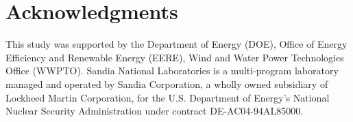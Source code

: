 \section{Acknowledgments}

This study was supported by the Department of Energy (DOE), Office of Energy
Efficiency and Renewable Energy (EERE), Wind and Water Power Technologies Office
(WWPTO). Sandia National Laboratories is a multi-program laboratory managed and
operated by Sandia Corporation, a wholly owned subsidiary of Lockheed Martin
Corporation, for the U.S. Department of Energy's National Nuclear Security
Administration under contract DE-AC04-94AL85000.

